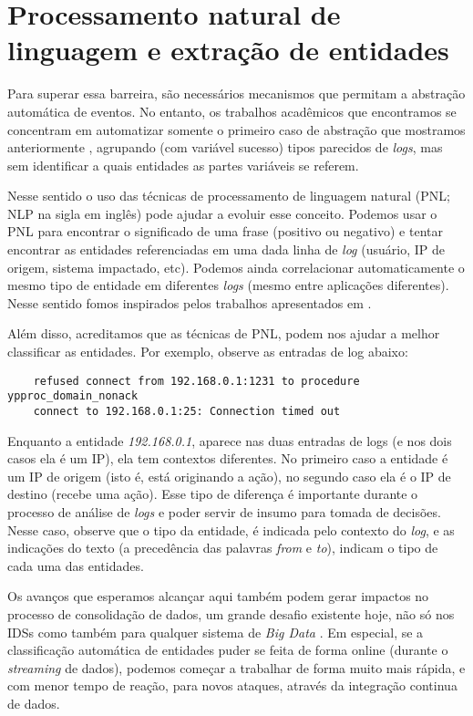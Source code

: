 \documentclass[
	12pt,				%
	openright,			%
	twoside,			%
	a4paper,			%
	english,			%
	spanish,			%
	brazil,				%
	]{abntex2}
\begin{document}
\section{Processamento natural de linguagem e extração de entidades}
Para superar essa barreira, são necessários mecanismos que permitam a abstração automática de eventos. No entanto, os trabalhos acadêmicos que encontramos se concentram em automatizar somente o primeiro caso de abstração que mostramos anteriormente \cite{vaarandi2003data, nagappan2010abstracting}, agrupando (com variável sucesso) tipos parecidos de \emph{logs}, mas sem identificar a quais entidades as partes variáveis se referem.

Nesse sentido o uso das técnicas de processamento de linguagem natural (PNL; NLP na sigla em inglês) pode ajudar a evoluir esse conceito. Podemos usar o PNL para encontrar o significado de uma frase (positivo ou negativo) e tentar encontrar as entidades referenciadas em uma dada linha de \emph{log} (usuário, IP de origem, sistema impactado, etc). Podemos ainda correlacionar automaticamente o mesmo tipo de entidade em diferentes \emph{logs} (mesmo entre aplicações diferentes).  Nesse sentido fomos inspirados pelos trabalhos apresentados em \cite{matos2010environment, duque2012processo}.

Além disso, acreditamos que as técnicas de PNL, podem nos ajudar a melhor classificar as entidades. Por exemplo, observe as entradas de log abaixo:

{\tiny
	\begin{verbatim}
	refused connect from 192.168.0.1:1231 to procedure ypproc_domain_nonack 
	connect to 192.168.0.1:25: Connection timed out
	\end{verbatim}
}

Enquanto a entidade \emph{192.168.0.1}, aparece nas duas entradas de logs (e nos dois casos ela é um IP), ela tem contextos diferentes. No primeiro caso a entidade é um IP de origem (isto é, está originando a ação), no segundo caso ela é o IP de destino (recebe uma ação). Esse tipo de diferença é importante durante o processo de análise de \emph{logs} e poder servir de insumo para tomada de decisões. Nesse caso, observe que o tipo da entidade, é indicada pelo contexto do \emph{log}, e as indicações do texto (a precedência das palavras \emph{from} e \emph{to}), indicam o tipo de cada uma das entidades.

Os avanços que esperamos alcançar aqui também podem gerar impactos no processo de consolidação de dados, um grande desafio existente hoje, não só nos IDSs como também para qualquer sistema de \emph{Big Data} \cite{zuech2015intrusion}. Em especial, se a classificação automática de entidades puder se feita de forma online (durante o  \emph{streaming} de dados), podemos começar a trabalhar de forma muito mais rápida, e com menor tempo de reação, para novos ataques, através da integração continua de dados.
\end{document}
